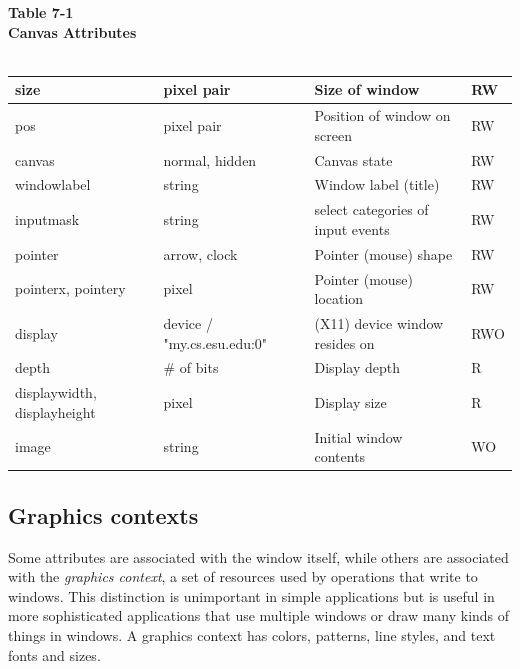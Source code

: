 \begin{center}
{\sffamily\bfseries Table 7-1} \\
{\sffamily\bfseries Canvas Attributes} \\
\ \\ 
  \begin{supertabular}{|m{1.03in}|m{1.9in}|m{2.24in}|m{0.44835988in}|}
    size & pixel pair & Size of window & RW \\\hline
    pos & pixel pair & Position of window on screen & RW \\\hline
    canvas & normal, hidden & Canvas state & RW\\\hline
    windowlabel & string & Window label (title) & RW \\\hline
    inputmask & string & select categories of input events & RW \\\hline
    pointer & arrow, clock & Pointer (mouse) shape  & RW \\\hline
    pointerx, pointery & pixel & Pointer (mouse) location & RW \\\hline
    display & device / "my.cs.esu.edu:0" & (X11) device window resides on & RWO \\\hline
    depth & \# of bits & Display depth & R \\\hline
    displaywidth, displayheight & pixel & Display size & R \\\hline
    image & string & Initial window contents & WO \\\hline
  \end{supertabular}
\end{center}

\subsection{Graphics contexts}

Some attributes are associated with the window itself, while others
are associated with the \textit{graphics context}, a set of resources
used by operations that write to windows. This distinction is
unimportant in simple applications but is useful in more sophisticated
applications that use multiple windows or draw many kinds of things in
windows. A graphics context has colors, patterns, line styles, and
text fonts and sizes.

